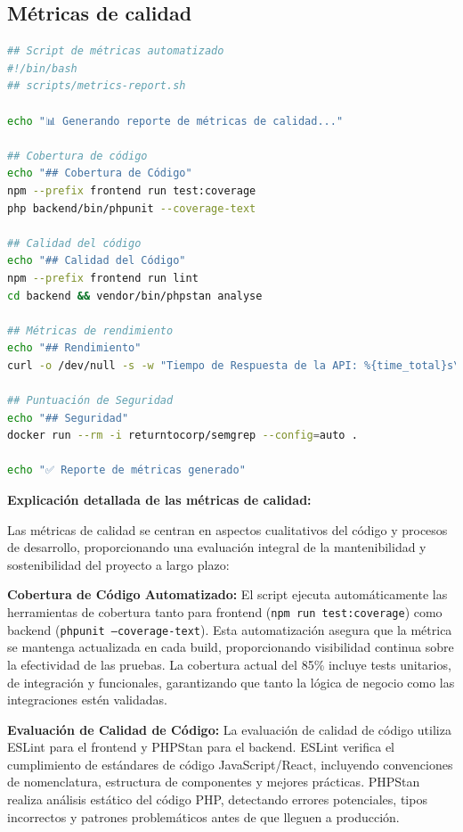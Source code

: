 \documentclass[12pt,a4paper,oneside]{report}
\begin{document}
\subsection{Métricas de calidad}\label{muxe9tricas-de-calidad}

\begin{lstlisting}[language=bash]
## Script de métricas automatizado
#!/bin/bash
## scripts/metrics-report.sh

echo "📊 Generando reporte de métricas de calidad..."

## Cobertura de código
echo "## Cobertura de Código"
npm --prefix frontend run test:coverage
php backend/bin/phpunit --coverage-text

## Calidad del código
echo "## Calidad del Código"
npm --prefix frontend run lint
cd backend && vendor/bin/phpstan analyse

## Métricas de rendimiento
echo "## Rendimiento"
curl -o /dev/null -s -w "Tiempo de Respuesta de la API: %{time_total}s\n" https://api.tfg-platform.com/health

## Puntuación de Seguridad
echo "## Seguridad"
docker run --rm -i returntocorp/semgrep --config=auto .

echo "✅ Reporte de métricas generado"
\end{lstlisting}

\textbf{Explicación detallada de las métricas de calidad:}

Las métricas de calidad se centran en aspectos cualitativos del código y procesos de desarrollo, proporcionando una evaluación integral de la mantenibilidad y sostenibilidad del proyecto a largo plazo:

\textbf{Cobertura de Código Automatizado:} El script ejecuta automáticamente las herramientas de cobertura tanto para frontend (\texttt{npm run test:coverage}) como backend (\texttt{phpunit --coverage-text}). Esta automatización asegura que la métrica se mantenga actualizada en cada build, proporcionando visibilidad continua sobre la efectividad de las pruebas. La cobertura actual del 85\% incluye tests unitarios, de integración y funcionales, garantizando que tanto la lógica de negocio como las integraciones estén validadas.

\textbf{Evaluación de Calidad de Código:} La evaluación de calidad de código utiliza ESLint para el frontend y PHPStan para el backend. ESLint verifica el cumplimiento de estándares de código JavaScript/React, incluyendo convenciones de nomenclatura, estructura de componentes y mejores prácticas. PHPStan realiza análisis estático del código PHP, detectando errores potenciales, tipos incorrectos y patrones problemáticos antes de que lleguen a producción.
\end{document}
